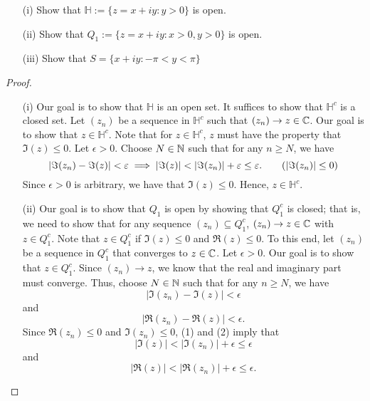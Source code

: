 \documentclass[a4paper]{article}
\begin{document}
\begin{problem}
    \begin{enumerate}
        \item[(i)] Show that \( \mathbb{H} := \{ z = x + iy : y > 0  \}  \) is open.
        \item[(ii)] Show that \( {Q}_{1} := \{ z = x + iy : x > 0, y > 0  \}   \) is open.
        \item[(iii)] Show that \( S = \{ x + iy: -\pi < y < \pi \}  \)
    \end{enumerate}
\end{problem}
\begin{proof}
\begin{enumerate}
    \item[(i)] Our goal is to show that \( \mathbb{H} \) is an open set. It suffices to show that \( \mathbb{H}^{c} \) is a closed set. Let \( ({z}_{n}) \) be a sequence in \( \mathbb{H}^{c} \) such that \( ({z}_{n}) \to z \in \mathbb{C}  \). Our goal is to show that \( z \in \mathbb{H}^{c} \). Note that for \( z \in \mathbb{H}^{c} \), \( z  \) must have the property that \( \Im(z) \leq 0 \). Let \( \epsilon > 0  \). Choose \( N \in \mathbb{N}  \) such that for any \( n \geq N  \), we have    
        \[  | \Im({z}_{n})  - \Im(z) | < \epsilon \implies | \Im(z) | < | \Im({z}_{n}) | + \epsilon \leq \epsilon. \tag{\( | \Im({z}_{n}) | \leq 0 \)}  \]
        Since \( \epsilon > 0 \) is arbitrary, we have that \( \Im(z) \leq 0  \). Hence, \( z \in \mathbb{H}^{c} \). 
    \item[(ii)] Our goal is to show that \( {Q}_{1} \) is open by showing that \( {Q}_{1}^{c} \) is closed; that is, we need to show that for any sequence \( ({z}_{n}) \subseteq  {Q}_{1}^{c}\), \( ({z}_{n}) \to z \in \mathbb{C}   \) with \( z \in {Q}_{1}^{c} \). Note that \( z \in {Q}_{1}^{c} \) if \( \Im(z) \leq 0 \) and \( \Re(z) \leq 0  \). To this end, let \( ({z}_{n})  \) be a sequence in \( {Q}_{1}^{c} \) that converges to \( z \in \mathbb{C}  \). Let \( \epsilon > 0  \). Our goal is to show that \( z \in {Q}_{1}^{c} \). Since \( ({z}_{n}) \to z  \), we know that the real and imaginary part must converge. Thus, choose \( N \in \mathbb{N}  \) such that for any \( n \geq N   \), we have
        \[  | \Im({z}_{n}) - \Im(z) | < \epsilon \tag{1} \]
        and 
        \[  | \Re({z}_{n}) - \Re(z) | < \epsilon.  \tag{2}\]
        Since \( \Re({z}_{n}) \leq 0  \) and \( \Im({z}_{n}) \leq 0  \), (1) and (2) imply that
        \[ | \Im(z) | < | \Im({z}_{n}) |  + \epsilon \leq \epsilon  \]
        and 
        \[  | \Re(z) | < | \Re({z}_{n}) | + \epsilon \leq \epsilon. \]

\end{enumerate}
\end{proof}
\end{document}
